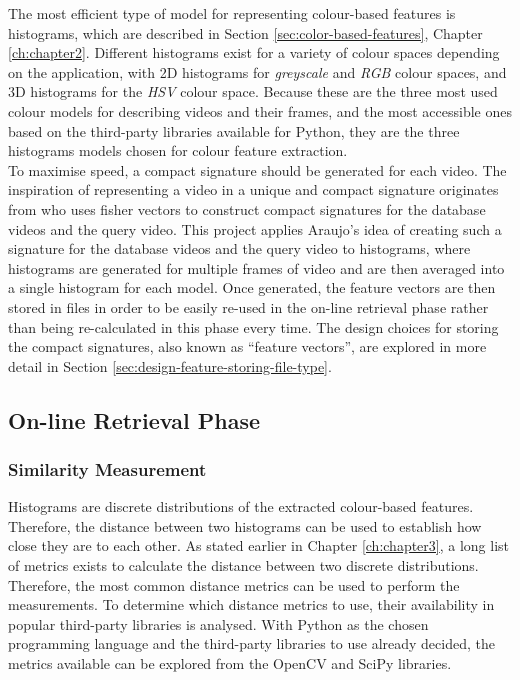 The most efficient type of model for representing colour-based features is histograms, which are described in Section \ref{sec:color-based-features}, Chapter \ref{ch:chapter2}. Different histograms exist for a variety of colour spaces depending on the application, with 2D histograms for \textit{greyscale} and \textit{RGB} colour spaces, and 3D histograms for the \textit{HSV} colour space. Because these are the three most used colour models for describing videos and their frames, and the most accessible ones based on the third-party libraries available for Python, they are the three histograms models chosen for colour feature extraction.\\ 

To maximise speed, a compact signature should be generated for each video. The inspiration of representing a video in a unique and compact signature originates from \cite{araujo2017i2v} who uses fisher vectors to construct compact signatures for the database videos and the query video. This project applies Araujo's idea of creating such a signature for the database videos and the query video to histograms, where histograms are generated for multiple frames of video and are then averaged into a single histogram for each model. Once generated, the feature vectors are then stored in files in order to be easily re-used in the on-line retrieval phase rather than being re-calculated in this phase every time. The design choices for storing the compact signatures, also known as ``feature vectors'', are explored in more detail in Section \ref{sec:design-feature-storing-file-type}. 


\subsection{On-line Retrieval Phase}
\label{sec:design-online-retrieval}

\subsubsection{Similarity Measurement}
\label{sec:design-online-retrieval-similarity-measurement}

Histograms are discrete distributions of the extracted colour-based features. Therefore, the distance between two histograms can be used to establish how close they are to each other. As stated earlier in Chapter \ref{ch:chapter3}, a long list of metrics exists to calculate the distance between two discrete distributions. Therefore, the most common distance metrics can be used to perform the measurements. To determine which distance metrics to use, their availability in popular third-party libraries is analysed. With Python as the chosen programming language and the third-party libraries to use already decided, the metrics available can be explored from the OpenCV and SciPy libraries.\\

